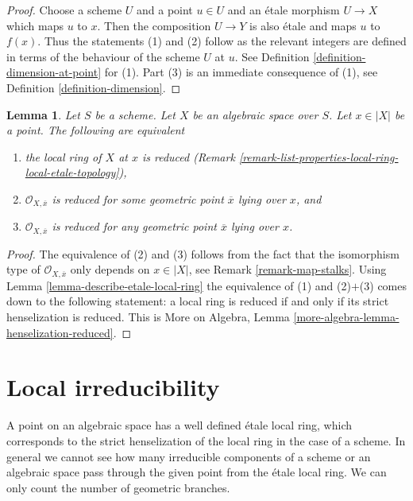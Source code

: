 \documentclass{stacks-project}
\theoremstyle{plain}
\newtheorem{lemma}[subsection]{Lemma}
\theoremstyle{definition}
\theoremstyle{remark}
\numberwithin{equation}{subsection}
\begin{document}
\begin{proof}
Choose a scheme $U$ and a point $u \in U$ and an \'etale morphism
$U \to X$ which maps $u$ to $x$. Then the composition $U \to Y$
is also \'etale and maps $u$ to $f(x)$. Thus the statements (1) and (2)
follow as the relevant integers are defined in terms of the behaviour
of the scheme $U$ at $u$. See
Definition \ref{definition-dimension-at-point} for (1). Part (3) is
an immediate consequence of (1), see Definition \ref{definition-dimension}.
\end{proof}

\begin{lemma}
\label{lemma-reduced-local-ring}
Let $S$ be a scheme. Let $X$ be an algebraic space over $S$.
Let $x \in |X|$ be a point. The following are equivalent
\begin{enumerate}
\item the local ring of $X$ at $x$ is reduced
(Remark \ref{remark-list-properties-local-ring-local-etale-topology}),
\item $\mathcal{O}_{X, \overline{x}}$ is reduced for some geometric
point $\overline{x}$ lying over $x$, and
\item $\mathcal{O}_{X, \overline{x}}$ is reduced for any geometric
point $\overline{x}$ lying over $x$.
\end{enumerate}
\end{lemma}

\begin{proof}
The equivalence of (2) and (3) follows from the fact that the
isomorphism type of $\mathcal{O}_{X, \overline{x}}$ only depends
on $x \in |X|$, see Remark \ref{remark-map-stalks}.
Using Lemma \ref{lemma-describe-etale-local-ring}
the equivalence of (1) and (2)$+$(3) comes down to the
following statement: a local ring is reduced if and only if
its strict henselization is reduced. This is
More on Algebra, Lemma \ref{more-algebra-lemma-henselization-reduced}.
\end{proof}











\section{Local irreducibility}
\label{section-irreducible-local-ring}

\noindent
A point on an algebraic space has a well defined \'etale local ring, which
corresponds to the strict henselization of the local ring in the case of a
scheme. In general we cannot see how many irreducible components of a
scheme or an algebraic space pass through the given point from the
\'etale local ring. We can only count the number of geometric branches.
\end{document}
